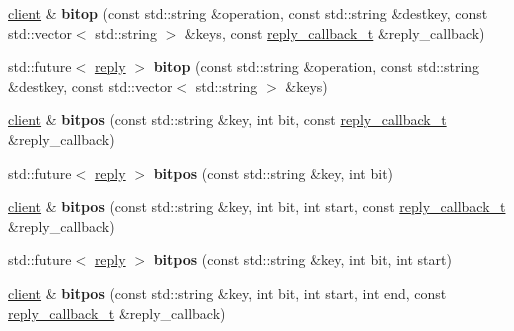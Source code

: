 \begin{DoxyCompactItemize}
\hyperlink{classcpp__redis_1_1client}{client} \& {\bfseries bitop} (const std\+::string \&operation, const std\+::string \&destkey, const std\+::vector$<$ std\+::string $>$ \&keys, const \hyperlink{classcpp__redis_1_1client_a061a1140d36d2eaeda82b09a0bb3f9f2}{reply\+\_\+callback\+\_\+t} \&reply\+\_\+callback)
\item 
\mbox{\label{classcpp__redis_1_1client_adbb955ee435dea43898ef811b31421b3}} 
std\+::future$<$ \hyperlink{classcpp__redis_1_1reply}{reply} $>$ {\bfseries bitop} (const std\+::string \&operation, const std\+::string \&destkey, const std\+::vector$<$ std\+::string $>$ \&keys)
\item 
\mbox{\label{classcpp__redis_1_1client_adf2ef5d020a8efbf6f6eb91cde63f262}} 
\hyperlink{classcpp__redis_1_1client}{client} \& {\bfseries bitpos} (const std\+::string \&key, int bit, const \hyperlink{classcpp__redis_1_1client_a061a1140d36d2eaeda82b09a0bb3f9f2}{reply\+\_\+callback\+\_\+t} \&reply\+\_\+callback)
\item 
\mbox{\label{classcpp__redis_1_1client_a5be47a4b3f9a36c4fab420468d50256a}} 
std\+::future$<$ \hyperlink{classcpp__redis_1_1reply}{reply} $>$ {\bfseries bitpos} (const std\+::string \&key, int bit)
\item 
\mbox{\label{classcpp__redis_1_1client_a8f6b7958a3094c975c3ca053b263c523}} 
\hyperlink{classcpp__redis_1_1client}{client} \& {\bfseries bitpos} (const std\+::string \&key, int bit, int start, const \hyperlink{classcpp__redis_1_1client_a061a1140d36d2eaeda82b09a0bb3f9f2}{reply\+\_\+callback\+\_\+t} \&reply\+\_\+callback)
\item 
\mbox{\label{classcpp__redis_1_1client_aa0ae004e45eb37ffed4d8c9f5ea35b4c}} 
std\+::future$<$ \hyperlink{classcpp__redis_1_1reply}{reply} $>$ {\bfseries bitpos} (const std\+::string \&key, int bit, int start)
\item 
\mbox{\label{classcpp__redis_1_1client_a3655449a666a9111d3dce7e61932ab1b}} 
\hyperlink{classcpp__redis_1_1client}{client} \& {\bfseries bitpos} (const std\+::string \&key, int bit, int start, int end, const \hyperlink{classcpp__redis_1_1client_a061a1140d36d2eaeda82b09a0bb3f9f2}{reply\+\_\+callback\+\_\+t} \&reply\+\_\+callback)

\end{DoxyCompactItemize}
